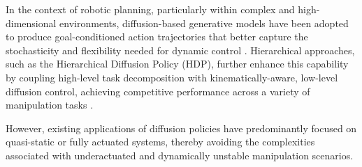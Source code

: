 \documentclass{article}
\begin{document}
In the context of robotic planning, particularly within complex and high-dimensional environments, diffusion-based generative models have been adopted to produce goal-conditioned action trajectories that better capture the stochasticity and flexibility needed for dynamic control \cite{chi2023diffusion, luo2024text}. Hierarchical approaches, such as the Hierarchical Diffusion Policy (HDP), further enhance this capability by coupling high-level task decomposition with kinematically-aware, low-level diffusion control, achieving competitive performance across a variety of manipulation tasks \cite{Ma_2024_CVPR}.

However, existing applications of diffusion policies have predominantly focused on quasi-static or fully actuated systems, thereby avoiding the complexities associated with underactuated and dynamically unstable manipulation scenarios.








\end{document}
